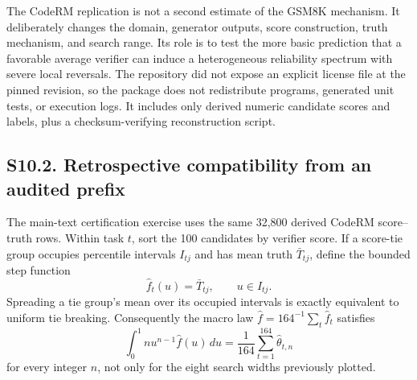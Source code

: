 The CodeRM replication is not a second estimate of the GSM8K mechanism. It deliberately changes the domain, generator outputs, score construction, truth mechanism, and search range. Its role is to test the more basic prediction that a favorable average verifier can induce a heterogeneous reliability spectrum with severe local reversals. The repository did not expose an explicit license file at the pinned revision, so the package does not redistribute programs, generated unit tests, or execution logs. It includes only derived numeric candidate scores and labels, plus a checksum-verifying reconstruction script.

\subsection*{S10.2. Retrospective compatibility from an audited prefix}

The main-text certification exercise uses the same 32,800 derived CodeRM score--truth rows. Within task $t$, sort the 100 candidates by verifier score. If a score-tie group occupies percentile intervals $I_{tj}$ and has mean truth $\bar T_{tj}$, define the bounded step function
\begin{equation}
\widehat f_t(u)=\bar T_{tj},\qquad u\in I_{tj}.
\label{si:eq:task-rank-law}
\end{equation}
Spreading a tie group's mean over its occupied intervals is exactly equivalent to uniform tie breaking. Consequently the macro law $\widehat f=164^{-1}\sum_t\widehat f_t$ satisfies
\begin{equation}
\int_0^1nu^{n-1}\widehat f(u)\,du
=\frac1{164}\sum_{t=1}^{164}\widehat\theta_{t,n}
\label{si:eq:macro-rank-law}
\end{equation}
for every integer $n$, not only for the eight search widths previously plotted.


